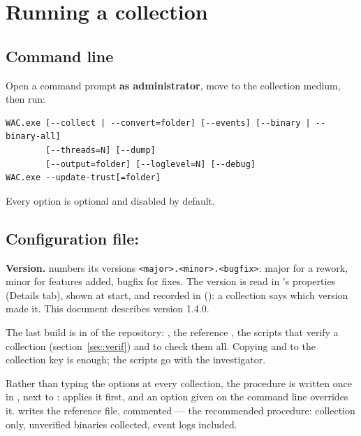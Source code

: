 \documentclass[11pt,a4paper,oneside]{report}
\begin{document}
\chapter{Running a collection}

\section{Command line}

Open a command prompt \textbf{as administrator}, move to the collection medium,
then run:

\begin{lstlisting}
WAC.exe [--collect | --convert=folder] [--events] [--binary | --binary-all]
        [--threads=N] [--dump]
        [--output=folder] [--loglevel=N] [--debug]
WAC.exe --update-trust[=folder]
\end{lstlisting}

Every option is optional and disabled by default.

\section{Configuration file: }

\textbf{Version.} \wac{} numbers its versions \texttt{<major>.<minor>.<bugfix>}:
major for a rework, minor for features added, bugfix for fixes. The version
is read in 's properties (Details tab), shown at start, and
recorded in  (): a collection
says which version made it. This document describes version 1.4.0.

The last build is in  of the repository: ,
the reference , the scripts that verify a collection
(section~\ref{sec:verif}) and  to check them all.
Copying  and  to the collection key is
enough; the scripts go with the investigator.

Rather than typing the options at every collection, the procedure is written
once in , next to : \wac{} applies it
first, and an option given on the command line overrides it.
 writes the reference file, commented — the recommended
procedure: collection only, unverified binaries collected, event logs
included.
\end{document}
